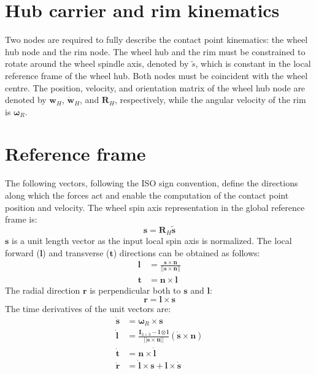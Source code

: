 \section{Hub carrier and rim kinematics}
Two nodes are required to fully describe the contact point kinematics: the wheel hub node and the rim node. The wheel hub and the rim must be constrained to rotate around the wheel spindle axis, denoted by $\tilde{s}$, which is constant in the local reference frame of the wheel hub. Both nodes must be coincident with the wheel centre.
The position, velocity, and orientation matrix of the wheel hub node are denoted by $\mathbf{w}_H$, $\dot{\mathbf{w}}_H$, and $\mathbf{R}_H$, respectively, while the angular velocity of the rim is $\boldsymbol{\omega}_R$.

\section{Reference frame}
The following vectors, following the ISO sign convention, define the directions along which the forces act and enable the computation of the contact point position and velocity.
The wheel spin axis representation in the global reference frame is:
\begin{equation}
    \mathbf{s} = \mathbf{R}_H \tilde{\mathbf{s}}
\end{equation}
$\mathbf{s}$ is a unit length vector as the input local spin axis is normalized.
The local forward ($\mathbf{l}$) and transverse ($\mathbf{t}$) directions can be obtained as follows:
\begin{equation}
    \begin{split}
        \mathbf{l} &= \frac{\mathbf{s} \times \mathbf{n}}{||\mathbf{s} \times \mathbf{n}||}\\
        \mathbf{t} &= \mathbf{n} \times \mathbf{l}
    \end{split}
\end{equation}
The radial direction $\mathbf{r}$ is perpendicular both to $\mathbf{s}$ and $\mathbf{l}$:
\begin{equation}
    \mathbf{r} = \mathbf{l} \times \mathbf{s}
\end{equation}
The time derivatives of the unit vectors are:
\begin{equation}
    \begin{split}
        \dot{\mathbf{s}} &= \boldsymbol{\omega}_R \times \mathbf{s} \\
        \dot{\mathbf{l}} &= \frac{\mathbf{I}_{3\times3} - \mathbf{l} \otimes \mathbf{l}}{||\mathbf{s} \times \mathbf{n}||}\left(\dot{\mathbf{s}} \times \mathbf{n}\right) \\
        \dot{\mathbf{t}} &= \mathbf{n} \times \dot{\mathbf{l}} \\
        \dot{\mathbf{r}} &= \dot{\mathbf{l}} \times \mathbf{s} + \mathbf{l} \times \dot{\mathbf{s}}
    \end{split}
\end{equation}


